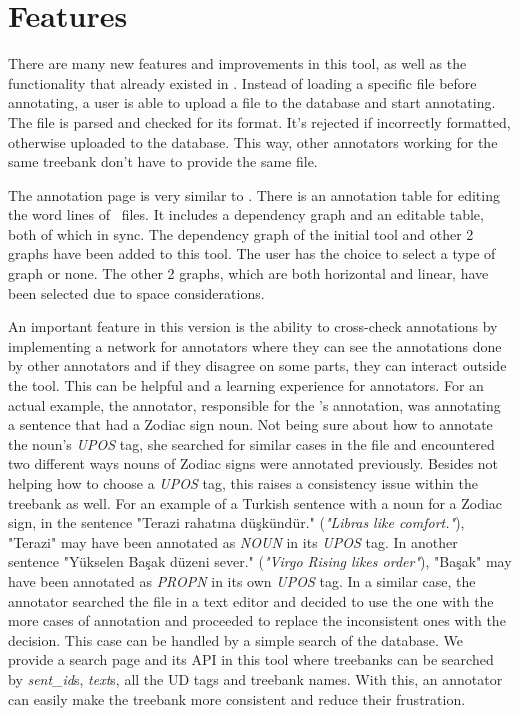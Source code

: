 \section{Features}
\label{sec:features}

There are many new features and improvements in this tool, as well as the functionality that already existed in \boatvone.
Instead of loading a specific file before annotating, a user is able to upload a \conllu{} file to the database and start annotating.
The file is parsed and checked for its format. It's rejected if incorrectly formatted, otherwise uploaded to the database.
This way, other annotators working for the same treebank don't have to provide the same file.

The annotation page is very similar to \boatvone.
There is an annotation table for editing the word lines of \conllu\ files.
It includes a dependency graph and an editable table, both of which in sync.
The dependency graph of the initial tool and other 2 graphs have been added to this tool.
The user has the choice to select a type of graph or none.
The other 2 graphs, which are both horizontal and linear, have been selected due to space considerations.

An important feature in this version is the ability to cross-check annotations by implementing a network for annotators where they can see the annotations done by other annotators and if they disagree on some parts, they can interact outside the tool.
This can be helpful and a learning experience for annotators.
For an actual example, the annotator, responsible for the \bountreebank{}'s annotation, was annotating a sentence that had a Zodiac sign noun.
Not being sure about how to annotate the noun's \textit{UPOS} tag, she searched for similar cases in the \conllu{} file and encountered two different ways nouns of Zodiac signs were annotated previously.
Besides not helping how to choose a \textit{UPOS} tag, this raises a consistency issue within the treebank as well.
For an example of a Turkish sentence with a noun for a Zodiac sign, in the sentence "Terazi rahatına düşkündür." (\textit{"Libras like comfort."}), "Terazi" may have been annotated as \textit{NOUN} in its \textit{UPOS} tag.
In another sentence "Yükselen Başak düzeni sever." (\textit{"Virgo Rising likes order"}), "Başak" may have been annotated as \textit{PROPN} in its own \textit{UPOS} tag.
In a similar case, the annotator searched the \conllu{} file in a text editor and decided to use the one with the more cases of annotation and proceeded to replace the inconsistent ones with the decision.
This case can be handled by a simple search of the database.
We provide a search page and its API in this tool where treebanks can be searched by \textit{sent\_id}s, \textit{text}s, all the UD tags and treebank names.
With this, an annotator can easily make the treebank more consistent and reduce their frustration.

